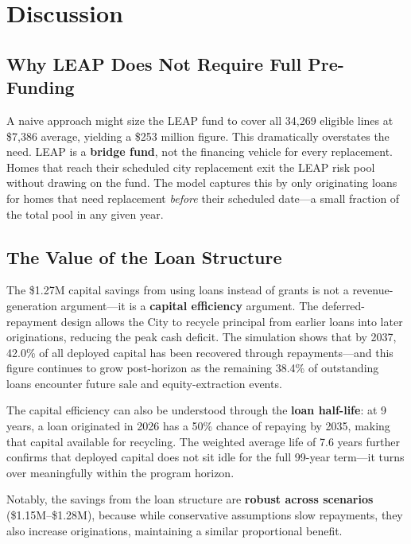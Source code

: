 \documentclass[11pt, letterpaper]{article}
\begin{document}
\section{Discussion}
\label{sec:discussion}

\subsection{Why LEAP Does Not Require Full Pre-Funding}

A naive approach might size the LEAP fund to cover all 34{,}269 eligible lines at \$7{,}386 average, yielding a \$253 million figure. This dramatically overstates the need. LEAP is a \textbf{bridge fund}, not the financing vehicle for every replacement. Homes that reach their scheduled city replacement exit the LEAP risk pool without drawing on the fund. The model captures this by only originating loans for homes that need replacement \emph{before} their scheduled date---a small fraction of the total pool in any given year.

\subsection{The Value of the Loan Structure}

The \$1.27M capital savings from using loans instead of grants is not a revenue-generation argument---it is a \textbf{capital efficiency} argument. The deferred-repayment design allows the City to recycle principal from earlier loans into later originations, reducing the peak cash deficit. The simulation shows that by 2037, 42.0\% of all deployed capital has been recovered through repayments---and this figure continues to grow post-horizon as the remaining 38.4\% of outstanding loans encounter future sale and equity-extraction events.

The capital efficiency can also be understood through the \textbf{loan half-life}: at 9 years, a loan originated in 2026 has a 50\% chance of repaying by 2035, making that capital available for recycling. The weighted average life of 7.6 years further confirms that deployed capital does not sit idle for the full 99-year term---it turns over meaningfully within the program horizon.

Notably, the savings from the loan structure are \textbf{robust across scenarios} (\$1.15M--\$1.28M), because while conservative assumptions slow repayments, they also increase originations, maintaining a similar proportional benefit.
\end{document}
